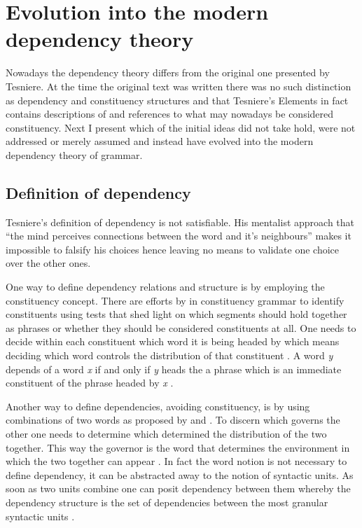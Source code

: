 

\section{Evolution into the modern dependency theory}
Nowadays the dependency theory differs from the original one presented by Tesniere. At the time the original text was written there was no such distinction as dependency and constituency structures and that Tesniere's Elements \citep{Tesniere59} in fact contains descriptions of and references to what may nowadays be considered constituency. 
Next I present which of the initial ideas did not take hold, were not addressed or merely assumed and instead have evolved into the modern dependency theory of grammar.

\subsection{Definition of dependency}
Tesniere's definition of dependency is not satisfiable. His mentalist approach that ``the mind perceives connections between the word and it's neighbours''\citep[3]{Tesniere2015} makes it impossible to falsify his choices hence leaving no means to validate one choice over the other ones.

One way to define dependency relations and structure is by employing the constituency concept. There are efforts by \citep{Bloomfield33,Hockett58,harris1951methods} in constituency grammar to identify constituents using tests that shed light on which segments should hold together as phrases or whether they should be considered constituents at all. One needs to decide within each constituent which word it is being headed by which means deciding which word controls the distribution of that constituent \citep{Bloomfield33,Zwicky85-heads} . A word \textit{y} depends of a word \textit{x} if and only if \textit{y} heads the a phrase which is an immediate constituent of the phrase headed by \textit{x} \citep{Lecerf1961}. 

Another way to define dependencies, avoiding constituency, is by using combinations of two words as proposed by \citet{Garde1977} and \citet{melcuk88}. To discern which governs the other one needs to determine which determined the distribution of the two together. This way the governor is the word that determines the environment in which the two together can appear \citep[lxi]{Tesniere2015}. In fact the word notion is not necessary to define dependency, it can be abstracted away to the notion of syntactic units. As soon as two units combine one can posit dependency between them whereby the dependency structure is the set of dependencies between the most granular syntactic units \citep{gerdes2013defining}.

